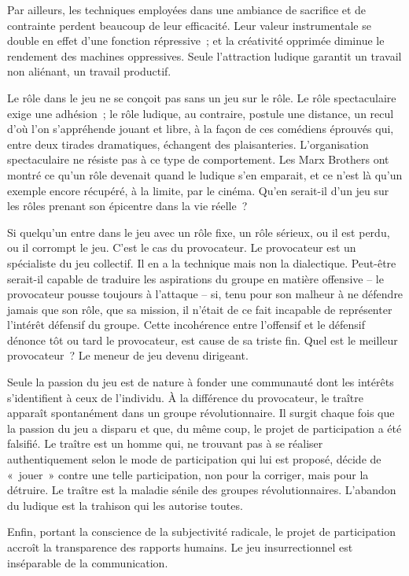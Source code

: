 \documentclass[french,twoside]{book} %
\begin{document}
Par ailleurs, les techniques employées dans une ambiance de sacrifice et de contrainte perdent beaucoup de leur efficacité. Leur valeur instrumentale se double en effet d’une fonction répressive ; et la créativité opprimée diminue le rendement des machines oppressives. Seule l’attraction ludique garantit un travail non aliénant, un travail productif.\par
Le rôle dans le jeu ne se conçoit pas sans un jeu sur le rôle. Le rôle spectaculaire exige une adhésion ; le rôle ludique, au contraire, postule une distance, un recul d’où l’on s’appréhende jouant et libre, à la façon de ces comédiens éprouvés qui, entre deux tirades dramatiques, échangent des plaisanteries. L’organisation spectaculaire ne résiste pas à ce type de comportement. Les Marx Brothers ont montré ce qu’un rôle devenait quand le ludique s’en emparait, et ce n’est là qu’un exemple encore récupéré, à la limite, par le cinéma. Qu’en serait-il d’un jeu sur les rôles prenant son épicentre dans la vie réelle ?\par
Si quelqu’un entre dans le jeu avec un rôle fixe, un rôle sérieux, ou il est perdu, ou il corrompt le jeu. C’est le cas du provocateur. Le provocateur est un spécialiste du jeu collectif. Il en a la technique mais non la dialectique. Peut-être serait-il capable de traduire les aspirations du groupe en matière offensive – le provocateur pousse toujours à l’attaque – si, tenu pour son malheur à ne défendre jamais que son rôle, que sa mission, il n’était de ce fait incapable de représenter l’intérêt défensif du groupe. Cette incohérence entre l’offensif et le défensif dénonce tôt ou tard le provocateur, est cause de sa triste fin. Quel est le meilleur provocateur ? Le meneur de jeu devenu dirigeant.\par
Seule la passion du jeu est de nature à fonder une communauté dont les intérêts s’identifient à ceux de l’individu. À la différence du provocateur, le traître apparaît spontanément dans un groupe révolutionnaire. Il surgit chaque fois que la passion du jeu a disparu et que, du même coup, le projet de participation a été falsifié. Le traître est un homme qui, ne trouvant pas à se réaliser authentiquement selon le mode de participation qui lui est proposé, décide de « jouer » contre une telle participation, non pour la corriger, mais pour la détruire. Le traître est la maladie sénile des groupes révolutionnaires. L’abandon du ludique est la trahison qui les autorise toutes.\par
Enfin, portant la conscience de la subjectivité radicale, le projet de participation accroît la transparence des rapports humains. Le jeu insurrectionnel est inséparable de la communication.
\end{document}
